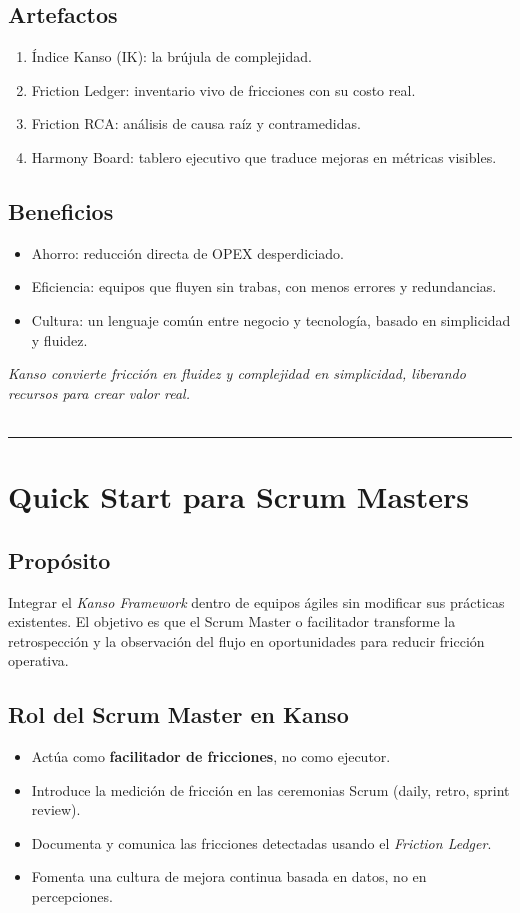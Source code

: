 \subsection*{Artefactos}
\begin{enumerate}
    \item Índice Kanso (IK): la brújula de complejidad.
    \item Friction Ledger: inventario vivo de fricciones con su costo real.
    \item Friction RCA: análisis de causa raíz y contramedidas.
    \item Harmony Board: tablero ejecutivo que traduce mejoras en métricas visibles.
\end{enumerate}

\subsection*{Beneficios}
\begin{itemize}
    \item Ahorro: reducción directa de OPEX desperdiciado.
    \item Eficiencia: equipos que fluyen sin trabas, con menos errores y redundancias.
    \item Cultura: un lenguaje común entre negocio y tecnología, basado en simplicidad y fluidez.
\end{itemize}

\textit{Kanso convierte fricción en fluidez y complejidad en simplicidad, liberando recursos para crear valor real.}
\\
\\
\hrule
\section{Quick Start para Scrum Masters}

\subsection*{Propósito}
Integrar el \textit{Kanso Framework} dentro de equipos ágiles sin modificar sus prácticas existentes.  
El objetivo es que el Scrum Master o facilitador transforme la retrospección y la observación del flujo en oportunidades para reducir fricción operativa.

\subsection*{Rol del Scrum Master en Kanso}
\begin{itemize}
    \item Actúa como \textbf{facilitador de fricciones}, no como ejecutor.
    \item Introduce la medición de fricción en las ceremonias Scrum (daily, retro, sprint review).
    \item Documenta y comunica las fricciones detectadas usando el \textit{Friction Ledger}.
    \item Fomenta una cultura de mejora continua basada en datos, no en percepciones.
\end{itemize}


